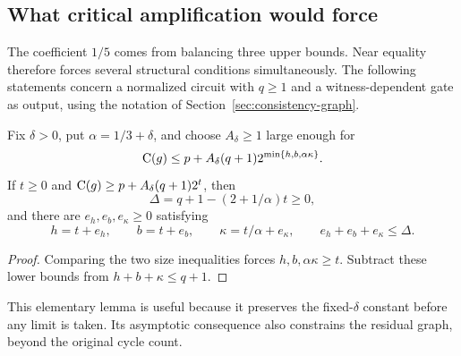 \subsection{What critical amplification would force}
\label{sec:critical-balance}

The coefficient $1/5$ comes from balancing three upper bounds.
Near equality therefore forces several structural conditions
simultaneously. The following statements concern a normalized circuit
with $q\ge1$ and a witness-dependent gate as output, using the notation
of Section~\ref{sec:consistency-graph}.

\begin{lemma}
\label{lem:finite-stability}
Fix $\delta>0$, put $\alpha=1/3+\delta$, and choose $A_\delta\ge1$
large enough for
\[
 \mathrm{C}(g)\le p+A_\delta(q+1)2^{\min\{h,b,\alpha\kappa\}}.
\]
If $t\ge0$ and $\mathrm{C}(g)\ge p+A_\delta(q+1)2^t$, then
\[
 \Delta=q+1-(2+1/\alpha)t\ge0,
\]
and there are $e_h,e_b,e_\kappa\ge0$ satisfying
\[
 h=t+e_h,\qquad b=t+e_b,\qquad
 \kappa=t/\alpha+e_\kappa,\qquad
 e_h+e_b+e_\kappa\le\Delta.
\]
\end{lemma}
\begin{proof}
Comparing the two size inequalities forces
$h,b,\alpha\kappa\ge t$. Subtract these lower bounds from
$h+b+\kappa\le q+1$.
\end{proof}

This elementary lemma is useful because it preserves the fixed-$\delta$
constant before any limit is taken. Its asymptotic consequence also
constrains the residual graph, beyond the original cycle count.

